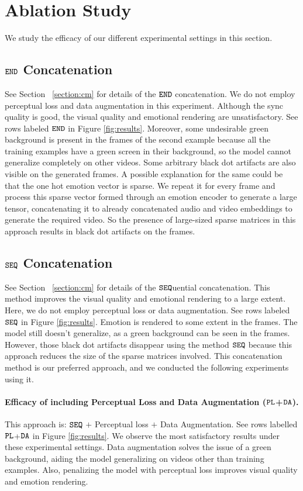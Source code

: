 \documentclass[accepted]{uai2023}
\begin{document}
\section{Ablation Study}
\label{section:r}
We study the efficacy of our different experimental settings in this section.
\subsection{${\tt END}$ Concatenation}
See Section ~\ref{section:cm} for details of the ${\tt END}$ concatenation. We do not employ perceptual loss and data augmentation in this experiment. Although the sync quality is good, the visual quality and emotional rendering are unsatisfactory. See rows labeled ${\tt END}$ in Figure \ref{fig:results}. Moreover, some undesirable green background is present in the frames of the second example because all the training examples have a green screen in their background, so the model cannot generalize completely on other videos. Some arbitrary black dot artifacts are also visible on the generated frames. A possible explanation for the same could be that the one hot emotion vector is sparse. We repeat it for every frame and process this sparse vector formed through an emotion encoder to generate a large tensor, concatenating it to already concatenated audio and video embeddings to generate the required video. So the presence of large-sized sparse matrices in this approach results in black dot artifacts on the frames.


\subsection{${\tt SEQ}$ Concatenation}
See Section ~\ref{section:cm} for details of the ${\tt SEQ}$uential concatenation. This method improves the visual quality and emotional rendering to a large extent. Here, we do not employ perceptual loss or data augmentation. See rows labeled ${\tt SEQ}$ in Figure \ref{fig:results}. Emotion is rendered to some extent in the frames. The model still doesn't generalize, as a green background can be seen in the frames. However, those black dot artifacts disappear using the method ${\tt SEQ}$ because this approach reduces the size of the sparse matrices involved. This concatenation method is our preferred approach, and we conducted the following experiments using it.



\paragraph{Efficacy of including Perceptual Loss and Data Augmentation (${\tt PL}$+${\tt DA}$).} 
\label{exp3}
This approach is: ${\tt SEQ}$ $+$ Perceptual loss $+$ Data Augmentation.  See rows labelled ${\tt PL}$+${\tt DA}$ in Figure \ref{fig:results}. We observe the most satisfactory results under these experimental settings. Data augmentation solves the issue of a green background, aiding the model generalizing on videos other than training examples.
Also, penalizing the model with perceptual loss improves visual quality and emotion rendering.
\end{document}
